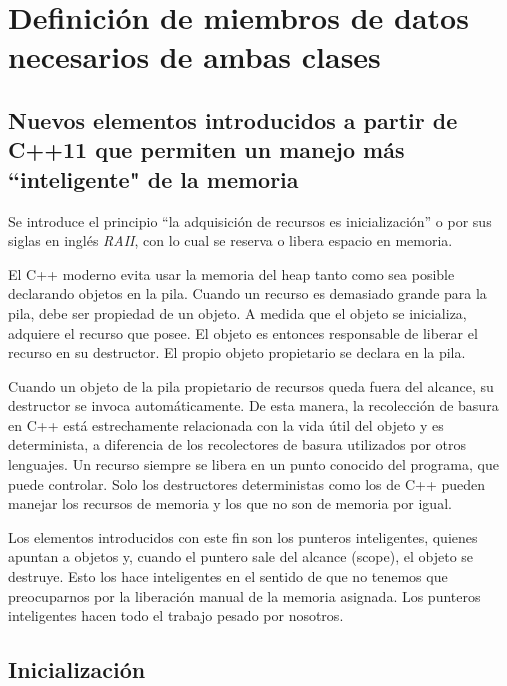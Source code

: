 \documentclass[10pt]{article}
\begin{document}
\vspace{2em}
\section{Definici\'on de miembros de datos necesarios de ambas clases}

\subsection{Nuevos elementos introducidos a partir de C++11 que permiten un manejo más ``inteligente" de la memoria}

Se introduce el principio ``la adquisición de recursos es inicialización'' o por sus siglas en ingl\'es \textit{RAII}, con lo cual se reserva o libera espacio en memoria. 

El C++ moderno evita usar la memoria del heap tanto como sea posible declarando objetos en la pila. Cuando un recurso es demasiado grande para la pila, debe ser propiedad de un objeto. A medida que el objeto se inicializa, adquiere el recurso que posee. El objeto es entonces responsable de liberar el recurso en su destructor. El propio objeto propietario se declara en la pila.  

Cuando un objeto de la pila propietario de recursos queda fuera del alcance, su destructor se invoca automáticamente. De esta manera, la recolección de basura en C++ está estrechamente relacionada con la vida útil del objeto y es determinista, a diferencia de los recolectores de basura utilizados por otros lenguajes. Un recurso siempre se libera en un punto conocido del programa, que puede controlar. Solo los destructores deterministas como los de C++ pueden manejar los recursos de memoria y los que no son de memoria por igual.

Los elementos introducidos con este fin son los punteros inteligentes, quienes apuntan a objetos y, cuando el puntero sale del alcance (scope), el objeto se destruye. Esto los hace inteligentes en el sentido de que no tenemos que preocuparnos por la liberaci\'on manual de la memoria asignada. Los punteros inteligentes hacen todo el trabajo pesado por nosotros.

\subsection{Inicializaci\'on}
\end{document}
